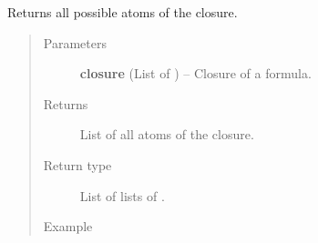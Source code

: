 \documentclass[letterpaper,10pt,english]{sphinxmanual}
\begin{document}
\begin{fulllineitems}
\label{modelCheckingGraph:modelCheckingGraph.getAllAtoms}
Returns all possible atoms of the closure.
\begin{quote}\begin{description}
\item[{Parameters}] \leavevmode
\textbf{closure} (List of {\hyperref[formula:formula.Formula]{}}) -- Closure of a formula.

\item[{Returns}] \leavevmode
List of all atoms of the closure.

\item[{Return type}] \leavevmode
List of lists of {\hyperref[formula:formula.Formula]{}}.

\item[{Example }] \leavevmode
\end{description}\end{quote}


\end{fulllineitems}
\end{document}
